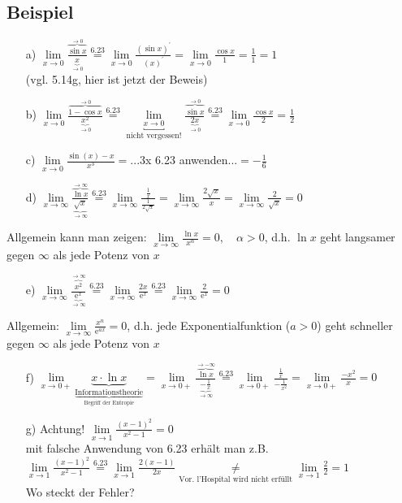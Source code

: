 \documentclass[12pt, titlepage]{article}
\newcommand{\e}{\textrm{e}}
\renewcommand{\>}{\rightarrow}
\renewcommand{\*}{\cdot}
\begin{document}
	\subsection{Beispiel}
	\begin{itemize}
		\item[a)] $\lim\limits_{x\>0}\frac{\overbrace{\sin x}^{\>0}}{\underbrace{x}_{\>0}}\overset{\textrm{6.23}}{=}\lim\limits_{x\>0}\frac{(\sin x)^\prime}{(x)^\prime}=\lim\limits_{x\>0}\frac{\cos x}{1}=\frac{1}{1}=1$\\
		(vgl. 5.14g, hier ist jetzt der Beweis)
		\item[b)] $\lim\limits_{x\>0}\frac{\overbrace{1-\cos x}^{\>0}}{\underbrace{x^2}_{\>0}}\overset{\textrm{6.23}}{=}\underbracket{\lim\limits_{x\>0}}_{\textrm{nicht vergessen!}}\frac{\overbrace{\sin x}^{\>0}}{\underbrace{2x}_{\>0}}\overset{\textrm{6.23}}{=}\lim\limits_{x\>0}\frac{\cos x}{2}=\frac{1}{2}$
		\item[c)] $\lim\limits_{x\>0}\frac{\sin(x)-x}{x^3}=$...3x 6.23 anwenden...$=-\frac{1}{6}$
		\item[d)] $\lim\limits_{x\>\infty}\frac{\overbrace{\ln x}^{\>\infty}}{\underbrace{\sqrt{x}}_{\>\infty}}\overset{\textrm{6.23}}{=}\lim\limits_{x\>\infty}\frac{\frac{1}{x}}{\frac{1}{2\sqrt{x}}}=\lim\limits_{x\>\infty}\frac{2\sqrt{x}}{x}=\lim\limits_{x\>\infty}\frac{2}{\sqrt{x}}=0$
	\end{itemize}
	Allgemein kann man zeigen: $\lim\limits_{x\>\infty}\frac{\ln x}{x^\alpha}=0,\quad\alpha>0$, d.h. $\ln x$ geht langsamer gegen $\infty$ als jede Potenz von $x$
	\begin{itemize}
		\item[e)] $\lim\limits_{x\>\infty}\frac{\overbrace{x^2}^{\>\infty}}{\underbrace{\e^x}_{\>\infty}}\overset{\textrm{6.23}}{=}\lim\limits_{x\>\infty}\frac{2x}{\e^x}\overset{\textrm{6.23}}{=}\lim\limits_{x\>\infty}\frac{2}{\e^x}=0$
	\end{itemize}
	Allgemein: $\lim\limits_{x\>\infty}\frac{x^n}{\e^{ax}}=0$, d.h. jede Exponentialfunktion ($a>0$) geht schneller gegen $\infty$ als jede Potenz von $x$
	\begin{itemize}
		\item[f)] $\lim\limits_{x\>0+}\underbrace{x\*\ln x}_{\underbrace{\textrm{Informationstheorie}}_{\textrm{Begriff der Entropie}}}=\lim\limits_{x\>0+}\frac{\overbrace{\ln x}^{\>-\infty}}{\underbrace{-\frac{1}{x}}_{\>\infty}}\overset{\textrm{6.23}}{=}\lim\limits_{x\>0+}\frac{\frac{1}{x}}{-\frac{1}{x^2}}=\lim\limits_{x\>0+}\frac{-x^2}{x}=0$
		\item[g)] Achtung! $\lim\limits_{x\>1}\frac{(x-1)^2}{x^2-1}=0$\\
		mit falsche Anwendung von 6.23 erhält man z.B.\\
		$\lim\limits_{x\>1}\frac{(x-1)^2}{x^2-1}\overset{\textrm{6.23}}{=}\lim\limits_{x\>1}\frac{2(x-1)}{2x}\underset{\textrm{Vor. l'Hospital wird nicht erfüllt}}{\neq}\lim\limits_{x\>1}\frac{2}{2}=1$\\
		Wo steckt der Fehler?
	\end{itemize}
	\newpage
\end{document}
